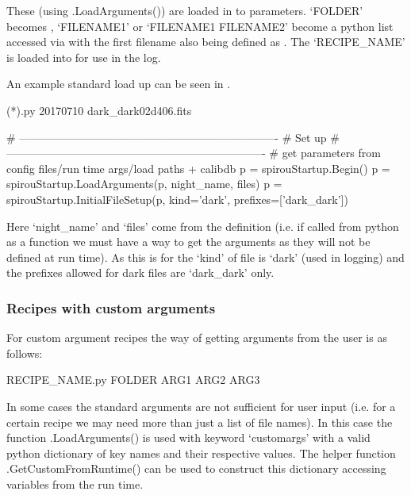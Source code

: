 These (using \spirouStartup.LoadArguments()) are loaded in to parameters. `FOLDER' becomes , `FILENAME1' or `FILENAME1 FILENAME2' become a python list accessed via  with the first filename also being defined as . The `RECIPE\_NAME' is loaded into  for use in the log.

An example standard load up can be seen in \calDARK.

\begin{cmdbox}
(*\calDARK*).py 20170710 dark_dark02d406.fits
\end{cmdbox}

\begin{pythonbox}
    # ----------------------------------------------------------------------
    # Set up
    # ----------------------------------------------------------------------
    # get parameters from config files/run time args/load paths + calibdb
    p = spirouStartup.Begin()
    p = spirouStartup.LoadArguments(p, night_name, files)
    p = spirouStartup.InitialFileSetup(p, kind='dark', prefixes=['dark_dark'])
\end{pythonbox}
\begin{note}
Here `night\_name' and `files' come from the \progMAIN definition (i.e. if called from python as a function we must have a way to get the arguments as they will not be defined at run time). As this is for \calDARK the `kind' of file is `dark' (used in logging) and the prefixes allowed for dark files are `dark\_dark' only.
\end{note}

\subsubsection{Recipes with custom arguments}
\label{ch:the_recipes:gen_layout:custom_arguments}

For custom argument recipes the way of getting arguments from the user is as follows:

\begin{cmdbox}
RECIPE_NAME.py FOLDER ARG1 ARG2 ARG3
\end{cmdbox}

In some cases the standard arguments are not sufficient for user input (i.e. for a certain recipe we may need more than just a list of file names). In this case the function \spirouStartup.LoadArguments() is used with keyword `customargs' with a valid python dictionary of key names and their respective values. The helper function \spirouStartup.GetCustomFromRuntime() can be used to construct this dictionary accessing variables from the run time. 

